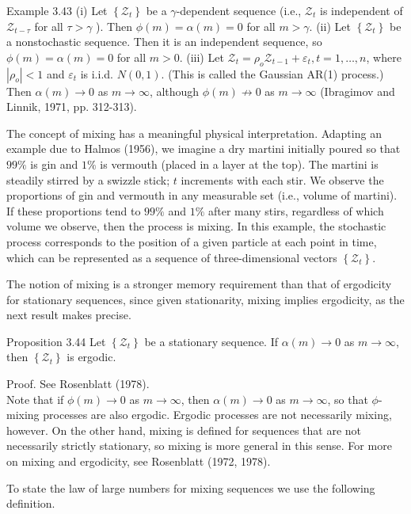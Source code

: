\documentclass[10pt]{article}
\begin{document}
Example 3.43 (i) Let $\left\{\mathcal{Z}_{t}\right\}$ be a $\gamma$-dependent sequence (i.e., $\mathcal{Z}_{t}$ is independent of $\mathcal{Z}_{t-\tau}$ for all $\tau>\gamma$ ). Then $\phi(m)=\alpha(m)=0$ for all $m>\gamma$. (ii) Let $\left\{\mathcal{Z}_{t}\right\}$ be a nonstochastic sequence. Then it is an independent sequence, so $\phi(m)=\alpha(m)=0$ for all $m>0$. (iii) Let $\mathcal{Z}_{t}=\rho_{o} \mathcal{Z}_{t-1}+\varepsilon_{t}, t=1, \ldots, n$, where $\left|\rho_{o}\right|<1$ and $\varepsilon_{t}$ is i.i.d. $N(0,1)$. (This is called the Gaussian AR(1) process.) Then $\alpha(m) \rightarrow 0$ as $m \rightarrow \infty$, although $\phi(m) \nrightarrow 0$ as $m \rightarrow \infty$ (Ibragimov and Linnik, 1971, pp. 312-313).

The concept of mixing has a meaningful physical interpretation. Adapting an example due to Halmos (1956), we imagine a dry martini initially poured so that $99 \%$ is gin and $1 \%$ is vermouth (placed in a layer at the top). The martini is steadily stirred by a swizzle stick; $t$ increments with each stir. We observe the proportions of gin and vermouth in any measurable set (i.e., volume of martini). If these proportions tend to $99 \%$ and $1 \%$ after many stirs, regardless of which volume we observe, then the process is mixing. In this example, the stochastic process corresponds to the position of a given particle at each point in time, which can be represented as a sequence of three-dimensional vectors $\left\{\mathcal{Z}_{t}\right\}$.

The notion of mixing is a stronger memory requirement than that of ergodicity for stationary sequences, since given stationarity, mixing implies ergodicity, as the next result makes precise.

Proposition 3.44 Let $\left\{\mathcal{Z}_{t}\right\}$ be a stationary sequence. If $\alpha(m) \rightarrow 0$ as $m \rightarrow \infty$, then $\left\{\mathcal{Z}_{t}\right\}$ is ergodic.

Proof. See Rosenblatt (1978).\\
Note that if $\phi(m) \rightarrow 0$ as $m \rightarrow \infty$, then $\alpha(m) \rightarrow 0$ as $m \rightarrow \infty$, so that $\phi$-mixing processes are also ergodic. Ergodic processes are not necessarily mixing, however. On the other hand, mixing is defined for sequences that are not necessarily strictly stationary, so mixing is more general in this sense. For more on mixing and ergodicity, see Rosenblatt (1972, 1978).

To state the law of large numbers for mixing sequences we use the following definition.
\end{document}
